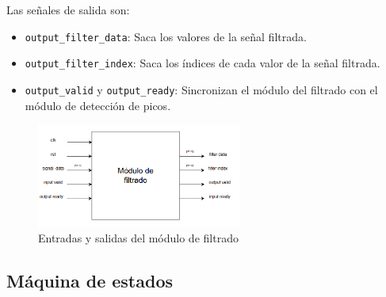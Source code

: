 Las señales de salida son:

\begin{itemize}
    \item \texttt{output\_filter\_data}: Saca los valores de la señal filtrada.
    \item \texttt{output\_filter\_index}: Saca los índices de cada valor de la señal filtrada.
    \item \texttt{output\_valid} y \texttt{output\_ready}: Sincronizan el módulo del filtrado con el módulo de detección de picos.
\end{itemize}

\begin{figure}[h!]
    \centering
    \includegraphics[width=0.6\textwidth]{./Images/img_implementacion_hw/diagramamodulofiltrado.png}
    \caption{Entradas y salidas del módulo de filtrado}
    \label{fig:modfiltrado}
\end{figure} 

\subsection{Máquina de estados}

